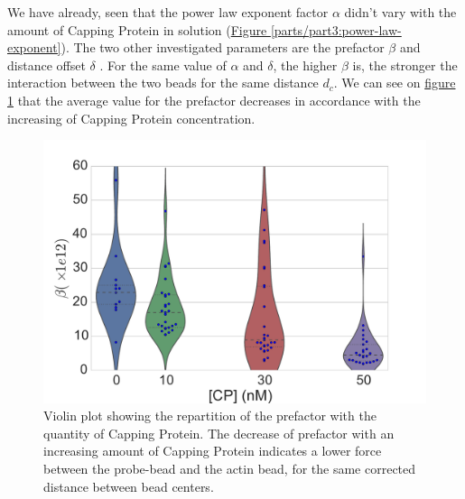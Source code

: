 \documentclass[A4paperpaper,11pt,english]{sphinxmanual}
\begin{document}
We have already,  seen  that the power law exponent factor \(\alpha\)
didn't vary with the amount of Capping Protein in solution (\hyperref[parts/part3:power-law-exponent]{Figure  \ref*{parts/part3:power-law-exponent}}).
The two other investigated parameters are the prefactor
\(\beta\) and distance offset \(\delta\) . For the same value of \(\alpha\) and \(\delta\), the
higher \(\beta\) is, the stronger the interaction between the two beads for
the same distance \(d_c\). We can see on \hyperref[parts/part3:beta-violin]{figure  \ref*{parts/part3:beta-violin}} that the
average value for the prefactor decreases in accordance with the increasing of Capping Protein
concentration.
\begin{figure}[htbp]
\centering
\capstart

\includegraphics[width=0.800\linewidth]{beta_violin.pdf}
\caption{Violin plot showing the repartition of the prefactor with the quantity of
Capping Protein. The decrease of prefactor with an increasing amount of Capping
Protein indicates a lower force between the probe-bead and the actin bead,
for the same corrected distance between bead centers.}\label{parts/part3:beta-violin}\end{figure}
\end{document}
